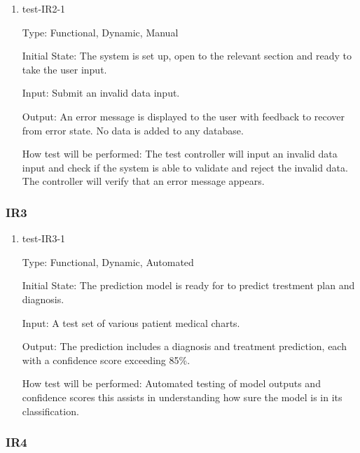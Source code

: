 \documentclass[12pt, titlepage]{article}
\begin{document}
  \begin{enumerate}

    \item{test-IR2-1} \label{test-IR2-1} 
    
    Type: Functional, Dynamic, Manual
    
    Initial State: The system is set up, open to the relevant section and ready to take the user input.
    
    Input: Submit an invalid data input.
    
    Output: An error message is displayed to the user with feedback to recover from error state. No data is added to any database. 
    
    How test will be performed: The test controller will input an invalid data input and check if the system is able to validate and reject the invalid data. The controller will verify that an error message appears.

  \end{enumerate}

\subsubsection{IR3}
    
  \begin{enumerate}


    \item{test-IR3-1}  \label{test-IR3-1}
    
    Type: Functional, Dynamic, Automated
    
    Initial State: The prediction model is ready for to predict trestment plan and diagnosis.
    
    Input: A test set of various patient medical charts.

    Output: The prediction includes a diagnosis and treatment prediction, each with a confidence score exceeding 85\%.
    
    How test will be performed: Automated testing of model outputs and confidence scores this assists in understanding how sure the model is in its classification.

  \end{enumerate}

  \subsubsection{IR4}
    
\end{document}
